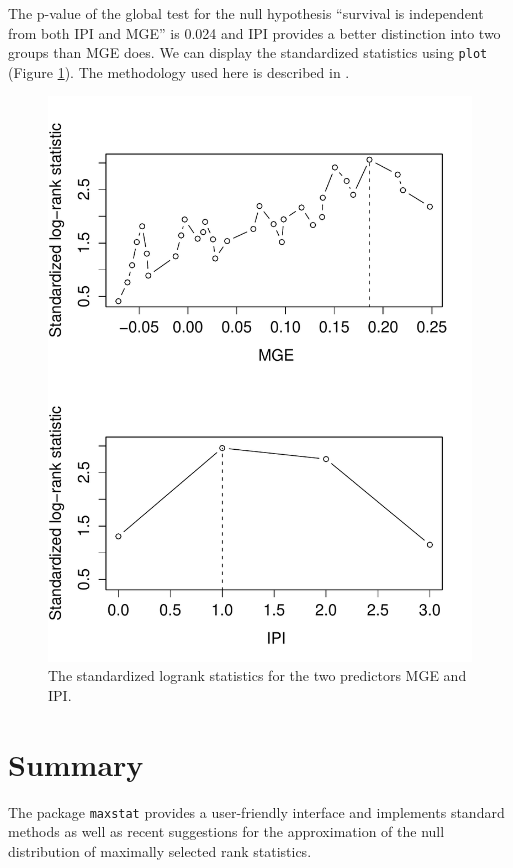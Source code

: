 \documentclass{article}
\begin{document}
The p-value of the global test for the null hypothesis ``survival is
independent from both IPI and MGE'' is 0.024 
and IPI provides a better distinction into two groups than 
MGE does. We can display the
standardized statistics using \texttt{plot} (Figure \ref{plotmmax}). The
methodology used here is described in \cite{lausenetal:2002}.

\begin{figure}[ht]
\begin{center}
\includegraphics{maxstat-mmax-fig}
\caption{The standardized logrank statistics for the two predictors MGE and
IPI. \label{plotmmax}}
\end{center}
\end{figure}

\section{Summary}

The package \texttt{maxstat} provides a user-friendly interface and 
implements standard methods as well as recent suggestions for the 
approximation of the null distribution of maximally selected rank statistics.




\end{document}
